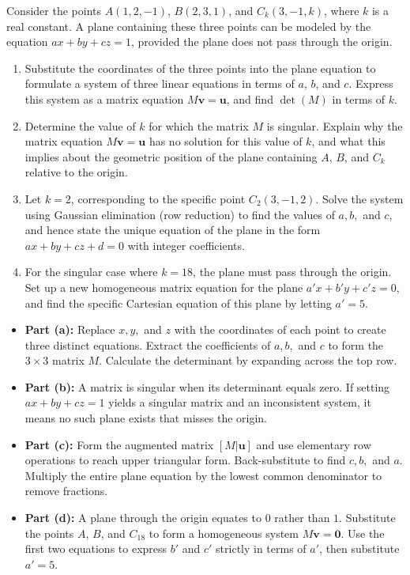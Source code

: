 \begin{problem}
Consider the points $A(1, 2, -1)$, $B(2, 3, 1)$, and $C_k(3, -1, k)$, where $k$ is a real constant. A plane containing these three points can be modeled by the equation $ax + by + cz = 1$, provided the plane does not pass through the origin.

\begin{enumerate}[label=\textbf{(\alph*)}]
    \item Substitute the coordinates of the three points into the plane equation to formulate a system of three linear equations in terms of $a$, $b$, and $c$. Express this system as a matrix equation $M \mathbf{v} = \mathbf{u}$, and find $\det(M)$ in terms of $k$.
    \item Determine the value of $k$ for which the matrix $M$ is singular. Explain why the matrix equation $M \mathbf{v} = \mathbf{u}$ has no solution for this value of $k$, and what this implies about the geometric position of the plane containing $A$, $B$, and $C_k$ relative to the origin.
    \item Let $k = 2$, corresponding to the specific point $C_2(3, -1, 2)$. Solve the system using Gaussian elimination (row reduction) to find the values of $a, b,$ and $c$, and hence state the unique equation of the plane in the form $ax + by + cz + d = 0$ with integer coefficients.
    \item For the singular case where $k = 18$, the plane must pass through the origin. Set up a new homogeneous matrix equation for the plane $a'x + b'y + c'z = 0$, and find the specific Cartesian equation of this plane by letting $a' = 5$.
\end{enumerate}
\end{problem}

\begin{hint}
\begin{itemize}
    \item \textbf{Part (a):} Replace $x, y,$ and $z$ with the coordinates of each point to create three distinct equations. Extract the coefficients of $a, b,$ and $c$ to form the $3 \times 3$ matrix $M$. Calculate the determinant by expanding across the top row.
    \item \textbf{Part (b):} A matrix is singular when its determinant equals zero. If setting $ax+by+cz=1$ yields a singular matrix and an inconsistent system, it means no such plane exists that misses the origin. 
    \item \textbf{Part (c):} Form the augmented matrix $[M | \mathbf{u}]$ and use elementary row operations to reach upper triangular form. Back-substitute to find $c, b,$ and $a$. Multiply the entire plane equation by the lowest common denominator to remove fractions.
    \item \textbf{Part (d):} A plane through the origin equates to $0$ rather than $1$. Substitute the points $A$, $B$, and $C_{18}$ to form a homogeneous system $M\mathbf{v} = \mathbf{0}$. Use the first two equations to express $b'$ and $c'$ strictly in terms of $a'$, then substitute $a'=5$.
\end{itemize}
\end{hint}

